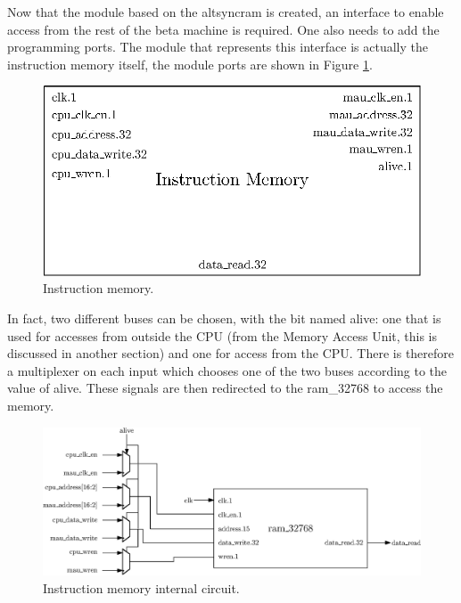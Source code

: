 Now that the module based on the altsyncram is created,  an interface to enable 
access from the rest of the beta machine is required. One also needs to add the programming ports. The
module that represents this interface is actually the instruction memory itself, the module ports
are shown in Figure \ref{fig:components/im}.

\begin{figure}[H]
    \centering
    \includegraphics[scale=0.8]{Chapter3-CPU/res/instruction_memory}
    \caption{Instruction memory.}
    \label{fig:components/im}
\end{figure}

In fact, two different buses can be chosen, with the bit named alive: one that is used for 
accesses from outside the CPU (from the Memory Access Unit, this is discussed in another 
section) and one for access from the CPU. There is therefore a multiplexer on each input which
chooses one of the two buses according to the value of alive. These signals are then redirected to 
the ram\_32768 to access the memory.

\begin{figure}[H]
    \centering
    \includegraphics[width=\linewidth]{Chapter3-CPU/res/instruction_memory_in}
    \caption{Instruction memory internal circuit.}
    \label{fig:components/im_in}
\end{figure}


